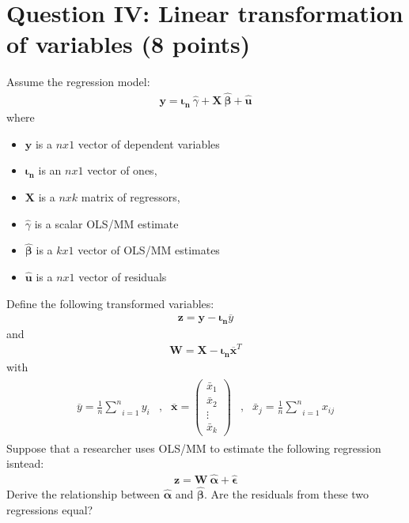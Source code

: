 \documentclass[letterpaper,12pt]{article}
\theoremstyle{dotlessS}
\begin{document}
\section*{Question IV: Linear transformation of variables (8 points)}
Assume the regression model:
\begin{eqnarray*}
\bm{y}=\bm{\iota_n} \: \hat{\gamma} + \bm{X} \: \bm{\hat{\beta}}+\bm{\hat{u}}
\end{eqnarray*}
where
\begin{itemize}
\item $\bm{y}$ is a $nx1$ vector of dependent variables
\item $\bm{\iota_n}$ is an $nx1$ vector of ones, 
\item $\bm{X}$ is a $nxk$ matrix of regressors, 
\item $\hat{\gamma}$ is a scalar OLS/MM estimate
\item $\bm{\hat{\beta}}$ is a $kx1$ vector of OLS/MM estimates
\item $\bm{\hat{u}}$ is a $nx1$ vector of residuals
\end{itemize}
Define the following transformed variables:
\begin{eqnarray*}
\bm{z}=\bm{y}- \bm{\iota_n} \overline{y}
\end{eqnarray*}
and
\begin{eqnarray*}
\bm{W}=\bm{X}-\bm{\iota_n} \bm{\overline{x}}^T
\end{eqnarray*}
with
\begin{eqnarray*}
\begin{array}{lllll}
\overline{y}=\frac{1}{n}\underset{i=1}{\overset{n}{\sum}}y_{i} &,& \bm{\overline{x}}=\begin{pmatrix} \bar{x}_1 \\ \bar{x}_2 \\ \vdots  \\  \bar{x}_k \end{pmatrix} &,& \bar{x}_j=\frac{1}{n}\underset{i=1}{\overset{n}{\sum}}x_{ij} 
\end{array}
\end{eqnarray*}
Suppose that a researcher uses OLS/MM to estimate the following regression isntead:
\begin{eqnarray*}
\bm{z}= \bm{W} \: \bm{\hat{\alpha}}+\bm{\hat{\epsilon}}
\end{eqnarray*}
Derive the relationship between $\bm{\hat{\alpha}}$ and $\bm{\hat{\beta}}$. Are the residuals from these two regressions equal?
\end{document}
